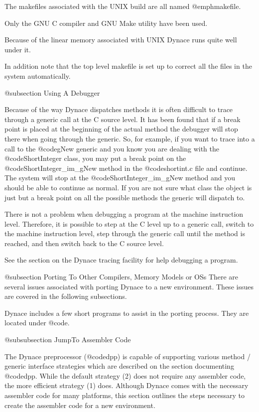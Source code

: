 The makefiles associated with the UNIX build are all named @emph{makefile}.

Only the GNU C compiler and GNU Make utility have been used.

Because of the linear memory associated with UNIX Dynace runs quite well under it.

In addition note that the top level makefile is set up to correct
all the files in the system automatically.

@subsection Using A Debugger

Because of the way Dynace dispatches methods it is often difficult to
trace through a generic call at the C source level.  It has been found
that if a break point is placed at the beginning of the actual method
the debugger will stop there when going through the generic.  So, for
example, if you want to trace into a call to the @code{gNew} generic and
you know you are dealing with the @code{ShortInteger} class, you may put
a break point on the @code{ShortInteger_im_gNew} method in the
@code{shortint.c} file and continue.  The system will stop at the
@code{ShortInteger_im_gNew} method and you should be able to continue as
normal.  If you are not sure what class the object is just but a break
point on all the possible methods the generic will dispatch to.

There is not a problem when debugging a program at the machine instruction
level.  Therefore, it is possible to step at the C level up to a generic
call, switch to the machine instruction level, step through the generic
call until the method is reached, and then switch back to the C source
level.


See the section on the Dynace tracing facility for help debugging
a program.



@subsection Porting To Other Compilers, Memory Models or OSs
There are several issues associated with porting Dynace to a new
environment.  These issues are covered in the following subsections.

Dynace includes a few short programs to assist in the porting process.
They are located under @code{\DYNACE\KERNEL\PORT}.


@subsubsection JumpTo Assembler Code

The Dynace preprocessor (@code{dpp}) is capable of supporting various
method / generic interface strategies which are described on the section
documenting @code{dpp}.  While the default strategy (2) does not require
any assembler code, the more efficient strategy (1) does.  Although
Dynace comes with the necessary assembler code for many platforms, this
section outlines the steps necessary to create the assembler code for a
new environment.

